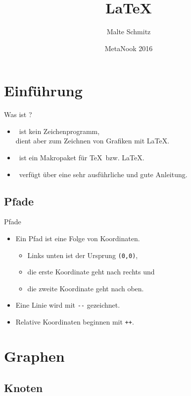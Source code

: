 \documentclass[xcolor=table]{beamer}
\author{Malte Schmitz}
\title{LaTeX}
\date{MetaNook 2016}
\begin{document}



\section{Einführung}

\begin{frame}{Was ist \TikZ?}
  \begin{itemize}
    \item \TikZ\ ist kein Zeichenprogramm,\\
      dient aber zum Zeichnen von Grafiken mit \LaTeX.
    \item \TikZ\ ist ein Makropaket für \TeX\ bzw. \LaTeX.
    \item \TikZ\ verfügt über eine sehr ausführliche und gute Anleitung.
  \end{itemize}
\end{frame}

\subsection{Pfade}

\begin{frame}{Pfade}
  \begin{itemize}
    \item Ein Pfad ist eine Folge von Koordinaten.
      \begin{itemize}
        \item Links unten ist der Ursprung \lstinline-(0,0)-,
        \item die erste Koordinate geht nach rechts und
        \item die zweite Koordinate geht nach oben.
      \end{itemize}
    \item Eine Linie wird mit \lstinline|--| gezeichnet.
    \item Relative Koordinaten beginnen mit \lstinline-++-.
  \end{itemize}
\end{frame}


\section{Graphen}

\subsection{Knoten}
\end{document}

